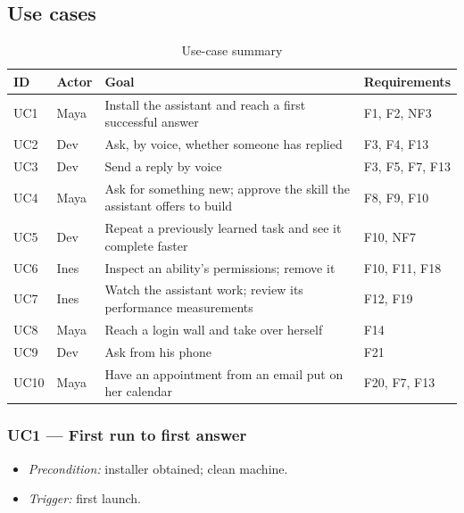 \documentclass[12pt]{article}
\begin{document}
\subsection{Use cases}\label{sec:use-cases}

\begin{table}[htbp]
  \centering
  \caption{Use-case summary}
  \label{tab:use-cases}
  \begin{tabularx}{\textwidth}{@{}l l X l@{}}
    \toprule
    \textbf{ID} & \textbf{Actor} & \textbf{Goal} & \textbf{Requirements} \\
    \midrule
    UC1 & Maya & Install the assistant and reach a first successful answer
      & F1, F2, NF3 \\
    UC2 & Dev & Ask, by voice, whether someone has replied & F3, F4, F13 \\
    UC3 & Dev & Send a reply by voice & F3, F5, F7, F13 \\
    UC4 & Maya & Ask for something new; approve the skill the assistant
      offers to build & F8, F9, F10 \\
    UC5 & Dev & Repeat a previously learned task and see it complete faster
      & F10, NF7 \\
    UC6 & Ines & Inspect an ability's permissions; remove it
      & F10, F11, F18 \\
    UC7 & Ines & Watch the assistant work; review its performance
      measurements & F12, F19 \\
    UC8 & Maya & Reach a login wall and take over herself & F14 \\
    UC9 & Dev & Ask from his phone & F21 \\
    UC10 & Maya & Have an appointment from an email put on her calendar
      & F20, F7, F13 \\
    \bottomrule
  \end{tabularx}
\end{table}

\subsubsection{UC1 --- First run to first answer}\label{sec:uc1}

\begin{itemize}[itemsep=1pt]
  \item \emph{Precondition:} installer obtained; clean machine.
  \item \emph{Trigger:} first launch.
\end{itemize}
\end{document}
